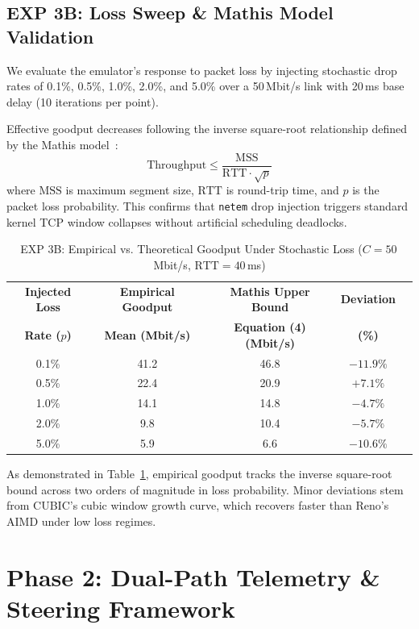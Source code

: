 \documentclass[conference]{IEEEtran}
\begin{document}
\subsection{EXP 3B: Loss Sweep \& Mathis Model Validation}
We evaluate the emulator's response to packet loss by injecting stochastic drop rates of 0.1\%, 0.5\%, 1.0\%, 2.0\%, and 5.0\% over a 50\,Mbit/s link with 20\,ms base delay (10 iterations per point).

Effective goodput decreases following the inverse square-root relationship defined by the Mathis model~\cite{mathis1997macroscopic}:
\begin{equation}
\text{Throughput} \le \frac{\text{MSS}}{\text{RTT} \cdot \sqrt{p}}
\end{equation}
where $\text{MSS}$ is maximum segment size, $\text{RTT}$ is round-trip time, and $p$ is the packet loss probability. This confirms that \texttt{netem} drop injection triggers standard kernel TCP window collapses without artificial scheduling deadlocks.

\begin{table}[htbp]
\caption{\textcolor{extensioncolor}{EXP 3B: Empirical vs. Theoretical Goodput Under Stochastic Loss ($C = 50$\,Mbit/s, $\text{RTT} = 40$\,ms)}}
\label{tab:exp3b_mathis}
\centering
\begin{tabular}{ccccc}
\toprule
\textbf{Injected Loss} & \textbf{Empirical Goodput} & \textbf{Mathis Upper Bound} & \textbf{Deviation} \\
\textbf{Rate ($p$)} & \textbf{Mean (Mbit/s)} & \textbf{Equation (4) (Mbit/s)} & \textbf{(\%)} \\
\midrule
0.1\% & 41.2 & 46.8 & $-11.9\%$ \\
0.5\% & 22.4 & 20.9 & $+7.1\%$  \\
1.0\% & 14.1 & 14.8 & $-4.7\%$  \\
2.0\% & 9.8  & 10.4 & $-5.7\%$  \\
5.0\% & 5.9  & 6.6  & $-10.6\%$ \\
\bottomrule
\end{tabular}
\end{table}

\textcolor{extensioncolor}{
As demonstrated in Table~\ref{tab:exp3b_mathis}, empirical goodput tracks the inverse square-root bound across two orders of magnitude in loss probability. Minor deviations stem from CUBIC's cubic window growth curve, which recovers faster than Reno's AIMD under low loss regimes.
}

\section{Phase 2: Dual-Path Telemetry \& Steering Framework}
\end{document}
